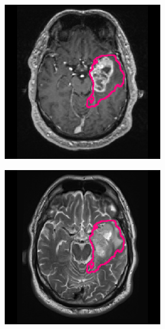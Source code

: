 \begin{subappendices}
\begin{figure}[htbp]
\begin{subfigure}[b]{0.8\textwidth}
\begin{subfigure}[b]{0.215\textwidth}
        \includegraphics[width=\textwidth, clip, trim=2.5cm 0.5cm 2.5cm 0.5cm]{Figures/Random_segs/T1GD_TCGA-19-5951.png}
        \end{subfigure}
        \hfill
        \begin{subfigure}[b]{0.215\textwidth}
        \includegraphics[width=\textwidth, clip, trim=2.5cm 0.5cm 2.5cm 0.5cm]{Figures/Random_segs/T2_TCGA-19-5951.png}

\end{subfigure}
\end{subfigure}
\end{figure}
\end{subappendices}
